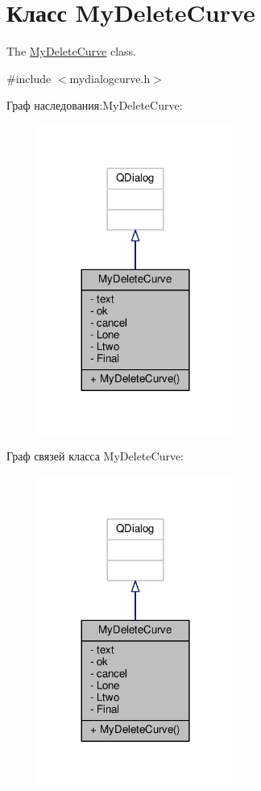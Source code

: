 \hypertarget{class_my_delete_curve}{}\section{Класс My\+Delete\+Curve}
\label{class_my_delete_curve}


The \hyperlink{class_my_delete_curve}{My\+Delete\+Curve} class.  




{\ttfamily \#include $<$mydialogcurve.\+h$>$}



Граф наследования\+:My\+Delete\+Curve\+:\nopagebreak
\begin{figure}[H]
\begin{center}
\leavevmode
\includegraphics[width=180pt]{class_my_delete_curve__inherit__graph}
\end{center}
\end{figure}


Граф связей класса My\+Delete\+Curve\+:\nopagebreak
\begin{figure}[H]
\begin{center}
\leavevmode
\includegraphics[width=180pt]{class_my_delete_curve__coll__graph}
\end{center}
\end{figure}
